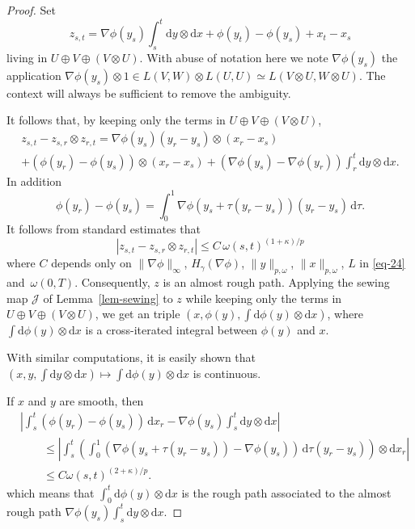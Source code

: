 \documentclass[a4paper,12pt]{article}
\theoremstyle{definition}
\newcommand{\vd}{\,\mathrm{d}}
\newcommand{\dd}{\mathrm{d}}
\begin{document}
\begin{proof}
Set
\begin{equation*}
z_{s,t}=\nabla \phi(y_s)\int_s^t \dd y\otimes\dd x+\phi(y_t)-\phi(y_s)
+x_t-x_s
\end{equation*}
living in $U\oplus V\oplus (V\otimes U)$. With abuse of notation here we note $\nabla \phi(y_s)$ the application $\nabla \phi(y_s) \otimes 1 \in L(V,W) \otimes L(U,U)\simeq L(V \otimes U, W \otimes U)$. The context will always be sufficient to remove the ambiguity.


It follows that, by keeping only the terms in $U\oplus V\oplus (V\otimes U)$,
\begin{multline*}
z_{s,t}-z_{s,r}\otimes z_{r,t}
=\nabla \phi(y_s)(y_r-y_s)\otimes (x_r-x_s)\\
+(\phi(y_r)-\phi(y_s))\otimes (x_r-x_s)
+(\nabla\phi(y_s)-\nabla \phi(y_r))\int_r^t \dd y\otimes\dd x.
\end{multline*}
In addition
\begin{equation*}
\phi(y_r)-\phi(y_s)=\int_0^1 \nabla \phi(y_s+\tau(y_r-y_s))(y_r-y_s)\vd \tau.
\end{equation*}
It follows from standard estimates that 
\begin{equation*}
|z_{s,t}-z_{s,r}\otimes z_{r,t}|\leq C\,\omega(s,t)^{(1+\kappa)/p}
\end{equation*}
where $C$ depends only on $\|\nabla \phi\|_{\infty}$, $H_\gamma(\nabla \phi)$, 
$\|y\|_{p,\omega}$, $\|x\|_{p,\omega}$, $L$ in \eqref{eq-24} and~$\omega(0,T)$.
Consequently, $z$ is an almost rough path. Applying the sewing map $\mathcal{J}$ of Lemma~\ref{lem-sewing}
to $z$ while keeping only the terms in $U\oplus V\oplus (V\otimes U)$, we get an triple
$\left(x,\phi(y),\int\dd\phi(y)\otimes\dd x\right)$, where 
$\int\dd\phi(y)\otimes\dd x$ is a cross-iterated integral between $\phi(y)$ and $x$.


With similar computations, it is easily shown that 
$\left(x,y,\int \dd y\otimes\dd x\right)\mapsto \int \dd\phi(y)\otimes\dd x$ is continuous.

If $x$ and $y$ are smooth, 
then 
\begin{equation*}
\begin{split}
& \left|\int_s^t (\phi(y_r)-\phi(y_s))\vd x_r
-\nabla \phi(y_s)\int_s^t \dd y\otimes\dd x
\right|\\
& \qquad \leq \left|\int_s^t \left(\int_0^1 (\nabla \phi(y_s+\tau(y_r-y_s))-\nabla\phi(y_s)) \vd \tau (y_r-y_s)\right) \otimes\dd x_r
\right|\\
& \qquad \leq C\omega(s,t)^{(2+\kappa)/p}.
\end{split}
\end{equation*}
which means that $\int_0^t \dd\phi(y)\otimes\dd x$ is the rough 
path associated to the almost rough path 
$\nabla \phi(y_s)\int_s^t \dd y\otimes\dd x$.
\end{proof}
\end{document}
